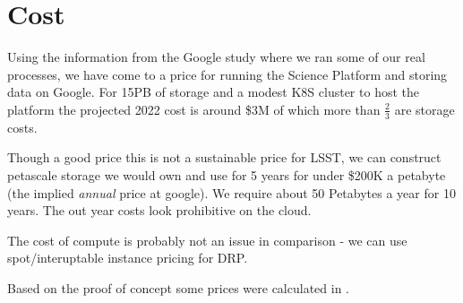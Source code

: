 
\section{Cost}
Using the information from the Google study where we ran some of our real processes, we have come to a price for running the \gls{Science Platform} and storing data on Google. For 15PB of storage and a modest K8S cluster to host the platform the projected 2022 cost is around \$3M of which more than $\frac{2}{3}$ are storage costs.

Though a good price this is not a sustainable price for \gls{LSST}, we can construct petascale storage we would own and use for 5 years for under \$200K a petabyte (the implied \emph{annual} price at google).  We require about 50 Petabytes a year for 10 years. The out year costs look prohibitive on the cloud.

The cost of compute is probably not an issue in comparison - we can use spot/interuptable instance pricing for \gls{DRP}.

Based on the proof of concept some prices were calculated in .


